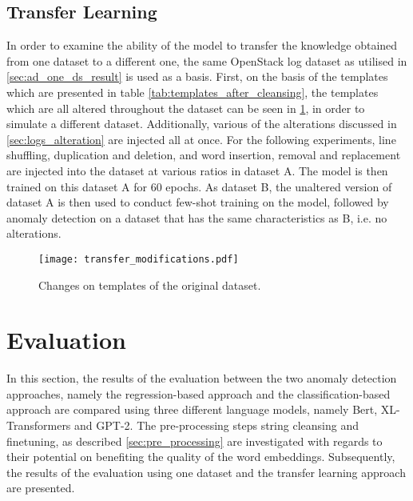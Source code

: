 \subsection{Transfer Learning \label{sec:transfer_learning_setup}}
In order to examine the ability of the model to transfer the knowledge obtained from one dataset to a different one, the same OpenStack log dataset as utilised in \ref{sec:ad_one_ds_result} is used as a basis. First, on the basis of the templates which are presented in table \ref{tab:templates_after_cleansing}, the templates which are all altered throughout the dataset can be seen in \ref{fig:transfer_modifications}, in order to simulate a different dataset. Additionally, various of the alterations discussed in \ref{sec:logs_alteration} are injected all at once. For the following experiments, line shuffling, duplication and deletion, and word insertion, removal and replacement are injected into the dataset at various ratios in dataset A. The model is then trained on this dataset A for 60 epochs. As dataset B, the unaltered version of dataset A is then used to conduct few-shot training on the model, followed by anomaly detection on a dataset that has the same characteristics as B, i.e. no alterations.

\begin{figure}[H]
  \centering
  \texttt{[image: transfer\_modifications.pdf]}\\
  \caption{Changes on templates of the original dataset.}
  \label{fig:transfer_modifications}
\end{figure}




\section{Evaluation\label{sec:evaluation}}
In this section, the results of the evaluation between the two anomaly detection approaches, namely the regression-based approach and the classification-based approach are compared using three different language models, namely Bert, XL-Transformers and GPT-2. The pre-processing steps string cleansing and finetuning, as described \ref{sec:pre_processing} are investigated with regards to their potential on benefiting the quality of the word embeddings. Subsequently, the results of the evaluation using one dataset and the transfer learning approach are presented.

